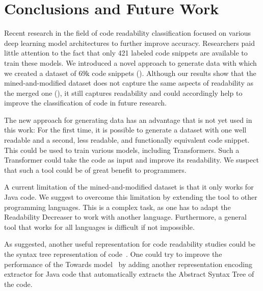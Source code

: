 \documentclass[%
class=scrreprt,
chapterprefix=false,%
open=right,%
twoside=true,%
paper=a4,%
logofile={Logo\_zentral\_farbig\_EN.png},%
thesistype=master,%
UKenglish,%
]{se2thesis}
\theoremstyle{definition}
\newcommand{\numSamples}{69k\xspace}
\newcommand{\RDH}{Readability Decreaser\xspace}
\begin{document}
	
\chapter{Conclusions and Future Work} \label{Conclusions}
	Recent research in the field of code readability classification focused on various deep learning model architectures to further improve accuracy. Researchers paid little attention to the fact that only 421 labeled code snippets are available to train these models. We introduced a novel approach to generate data with which we created a dataset of \numSamples code snippets (). Although our results show that the mined-and-modified dataset does not capture the same aspects of readability as the merged one (), it still captures readability and could accordingly help to improve the classification of code in future research.
	
	The new approach for generating data has an advantage that is not yet used in this work: For the first time, it is possible to generate a dataset with one well readable and a second, less readable, and functionally equivalent code snippet. This could be used to train various models, including Transformers. Such a Transformer could take the code as input and improve its readability. We suspect that such a tool could be of great benefit to programmers.	
	
	A current limitation of the mined-and-modified dataset is that it only works for Java code. We suggest to overcome this limitation by extending the tool to other programming languages. This is a complex task, as one has to adapt the \RDH to work with another language. Furthermore, a general tool that works for all languages is difficult if not impossible.
	
	
	As \citeauthor{mi2023graph} suggested, another useful representation for code readability studies could be the syntax tree representation of code~\cite{mi2023graph}. One could try to improve the performance of the Towards model~\cite{mi2022towards} by adding another representation encoding extractor for Java code that automatically extracts the Abstract Syntax Tree of the code.
	
\end{document}
